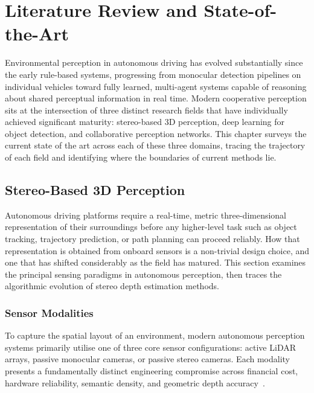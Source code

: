 \chapter{Literature Review and State-of-the-Art}
\label{ch:sota}

Environmental perception in autonomous driving has evolved substantially since
the early rule-based systems, progressing from monocular detection pipelines on
individual vehicles toward fully learned, multi-agent systems capable of
reasoning about shared perceptual information in real time. Modern cooperative
perception sits at the intersection of three distinct research fields that have
individually achieved significant maturity: stereo-based 3D perception, deep
learning for object detection, and collaborative perception networks. This
chapter surveys the current state of the art across each of these three domains,
tracing the trajectory of each field and identifying where the boundaries of
current methods lie.

\section{Stereo-Based 3D Perception}
\label{sec:stereo3d}

Autonomous driving platforms require a real-time, metric three-dimensional
representation of their surroundings before any higher-level task such as object
tracking, trajectory prediction, or path planning can proceed reliably. How that
representation is obtained from onboard sensors is a non-trivial design choice,
and one that has shifted considerably as the field has matured. This section
examines the principal sensing paradigms in autonomous perception, then traces
the algorithmic evolution of stereo depth estimation methods.

\subsection{Sensor Modalities}

To capture the spatial layout of an environment, modern autonomous perception
systems primarily utilise one of three core sensor configurations: active LiDAR arrays, passive monocular cameras, or passive
stereo cameras. Each modality presents a fundamentally distinct engineering
compromise across financial cost, hardware reliability, semantic density, and
geometric depth accuracy~\cite{valverde2025}.

